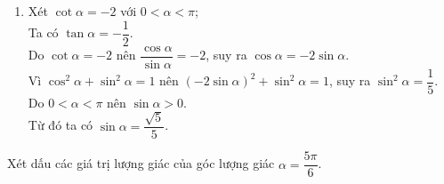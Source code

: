 \begin{bt}
{\begin{enumerate}
			Vì $\cos^2\alpha+\sin^2\alpha=1$ nên $\cos^2\alpha+(3\cos\alpha)^2=1$, suy ra $\cos^2 \alpha=\dfrac{1}{10}$.
			\begin{itemize}
				\item Do $-\dfrac{\pi}{2}<\alpha<0$ nên $\cos \alpha>0$.\\
				Từ đó ta có $\cos \alpha=\dfrac{\sqrt{10}}{10}$.
				\item Do $-\pi<\alpha<-\dfrac{\pi}{2}$ nên $\cos \alpha<0$.\\
				Từ đó ta có $\cos \alpha=-\dfrac{\sqrt{10}}{10}$.
			\end{itemize}
			\item Xét $\cot \alpha=-2$ với $0<\alpha<\pi$;\\
			Ta có $\tan \alpha=-\dfrac{1}{2}$.\\
			Do $\cot \alpha=-2$ nên $\dfrac{\cos \alpha}{\sin \alpha}=-2$, suy ra $\cos \alpha=-2\sin \alpha$.\\
			Vì $\cos^2\alpha+\sin^2\alpha=1$ nên $(-2\sin \alpha)^2+\sin^2\alpha=1$, suy ra $\sin^2 \alpha=\dfrac{1}{5}$.\\
			Do $0<\alpha<\pi$ nên $\sin \alpha>0$.\\
			Từ đó ta có $\sin \alpha=\dfrac{\sqrt{5}}{5}$.
		\end{enumerate}
	}
\end{bt}

\begin{bt}%

	Xét dấu các giá trị lượng giác của góc lượng giác $\alpha=\dfrac{5 \pi}{6}$.
\end{bt}

